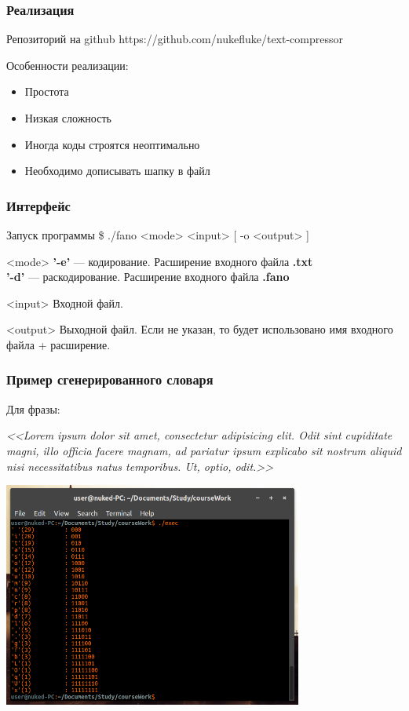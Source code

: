 \documentclass[10pt,pdf,hyperref={unicode}]{beamer}
\begin{document}
\begin{frame}
	\frametitle{Реализация}

	\begin{block}{Репозиторий на github}
		https://github.com/nukefluke/text-compressor
	\end{block}
	\vspace{1em}
	Особенности реализации:
	\begin{itemize}
		\item Простота
		\item Низкая сложность
		\item Иногда коды строятся неоптимально
		\item Необходимо дописывать шапку в файл
	\end{itemize}
\end{frame}

\begin{frame}
	\frametitle{Интерфейс}
	\begin{block}{Запуск программы}
		\$ ./fano <mode> <input> [ -o <output> ]
	\end{block}
	\begin{exampleblock}{<mode>}
		\textbf{'-e'} --- кодирование. Расширение входного файла \textbf{.txt}\\
		\textbf{'-d'} --- раскодирование. Расширение входного файла \textbf{.fano}
	\end{exampleblock}
	\begin{exampleblock}{<input>}
		Входной файл.
	\end{exampleblock}
	\begin{exampleblock}{<output>}
		Выходной файл. Если не указан, то будет 
		использовано имя входного файла + расширение.
	\end{exampleblock}
\end{frame}

\begin{frame}
	\frametitle{Пример сгенерированного словаря}
	Для фразы:

	\vspace{1em}
	\scriptsize{\textit{<<Lorem ipsum dolor sit amet, consectetur adipisicing elit. Odit sint cupiditate magni, illo officia facere magnam, ad pariatur ipsum explicabo sit nostrum aliquid nisi necessitatibus natus temporibus. Ut, optio, odit.>>}}

	\vspace{1em}
	\centerline{\includegraphics[height=20em]{gen.png}}
\end{frame}
\end{document}
